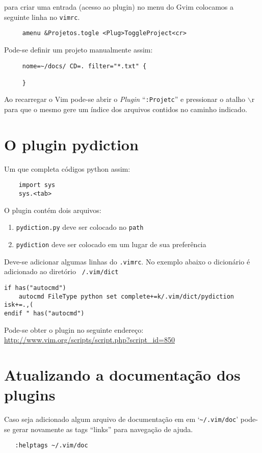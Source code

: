 para criar uma entrada (acesso ao plugin) no menu do Gvim colocamos
a seguinte linha no {\tt vimrc}.

\begin{verbatim}
     amenu &Projetos.togle <Plug>ToggleProject<cr>
\end{verbatim}

Pode-se definir um projeto manualmente assim:

\begin{verbatim}
     nome=~/docs/ CD=. filter="*.txt" {

     }
\end{verbatim}

Ao recarregar o Vim pode-se abrir o {\em Plugin} ``{\tt :Projetc}'' e 
pressionar o atalho $\backslash$r para que o mesmo gere um índice dos arquivos
contidos no caminho indicado.
   

\section{O plugin pydiction}
\label{sec:O plugin pydiction}

Um que completa códigos python assim:

\begin{verbatim}
    import sys
    sys.<tab>
\end{verbatim}

O plugin contém dois arquivos:

\begin{enumerate}
    \item {\tt pydiction.py} deve ser colocado no {\tt path}
    \item {\tt pydiction} deve ser colocado em um lugar de sua preferência
\end{enumerate}

Deve-se adicionar algumas linhas do {\tt .vimrc}.
No exemplo abaixo o dicionário é adicionado ao diretório {\tt ~/.vim/dict}
\begin{verbatim}
if has("autocmd")
    autocmd FileType python set complete+=k/.vim/dict/pydiction isk+=.,(
endif " has("autocmd") 
\end{verbatim}

Pode-se obter o plugin no seguinte endereço: \url{http://www.vim.org/scripts/script.php?script\_id=850}

\section{Atualizando a documentação dos plugins}
\label{sec:Atualizando a documentação dos plugins}

Caso seja adicionado algum arquivo de documentação em em `\verb+~/.vim/doc+' pode-se
gerar novamente as tags ``links'' para navegação de ajuda.

\begin{verbatim}
   :helptags ~/.vim/doc
\end{verbatim}
